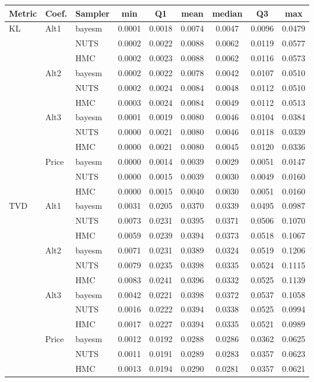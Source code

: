 \begin{tabular}{lllcccccc}
\toprule
Metric & Coef. & Sampler & min & Q1 & mean & median & Q3 & max \\
\midrule
KL & Alt1 & bayesm & 0.0001 & 0.0018 & 0.0074 & 0.0047 & 0.0096 & 0.0479 \\
 &  & NUTS & 0.0002 & 0.0022 & 0.0088 & 0.0062 & 0.0119 & 0.0577 \\
 &  & HMC & 0.0002 & 0.0023 & 0.0088 & 0.0062 & 0.0116 & 0.0573 \\
 & Alt2 & bayesm & 0.0002 & 0.0022 & 0.0078 & 0.0042 & 0.0107 & 0.0510 \\
 &  & NUTS & 0.0002 & 0.0024 & 0.0084 & 0.0048 & 0.0112 & 0.0510 \\
 &  & HMC & 0.0003 & 0.0024 & 0.0084 & 0.0049 & 0.0112 & 0.0513 \\
 & Alt3 & bayesm & 0.0001 & 0.0019 & 0.0080 & 0.0046 & 0.0104 & 0.0384 \\
 &  & NUTS & 0.0000 & 0.0021 & 0.0080 & 0.0046 & 0.0118 & 0.0339 \\
 &  & HMC & 0.0000 & 0.0021 & 0.0080 & 0.0045 & 0.0120 & 0.0336 \\
 & Price & bayesm & 0.0000 & 0.0014 & 0.0039 & 0.0029 & 0.0051 & 0.0147 \\
 &  & NUTS & 0.0000 & 0.0015 & 0.0039 & 0.0030 & 0.0049 & 0.0160 \\
 &  & HMC & 0.0000 & 0.0015 & 0.0040 & 0.0030 & 0.0051 & 0.0160 \\
TVD & Alt1 & bayesm & 0.0031 & 0.0205 & 0.0370 & 0.0339 & 0.0495 & 0.0987 \\
 &  & NUTS & 0.0073 & 0.0231 & 0.0395 & 0.0371 & 0.0506 & 0.1070 \\
 &  & HMC & 0.0059 & 0.0239 & 0.0394 & 0.0373 & 0.0518 & 0.1067 \\
 & Alt2 & bayesm & 0.0071 & 0.0231 & 0.0389 & 0.0324 & 0.0519 & 0.1206 \\
 &  & NUTS & 0.0079 & 0.0235 & 0.0398 & 0.0335 & 0.0524 & 0.1115 \\
 &  & HMC & 0.0083 & 0.0241 & 0.0396 & 0.0332 & 0.0525 & 0.1139 \\
 & Alt3 & bayesm & 0.0042 & 0.0221 & 0.0398 & 0.0372 & 0.0537 & 0.1058 \\
 &  & NUTS & 0.0016 & 0.0222 & 0.0394 & 0.0338 & 0.0525 & 0.0994 \\
 &  & HMC & 0.0017 & 0.0227 & 0.0394 & 0.0335 & 0.0521 & 0.0989 \\
 & Price & bayesm & 0.0012 & 0.0192 & 0.0288 & 0.0286 & 0.0362 & 0.0625 \\
 &  & NUTS & 0.0011 & 0.0191 & 0.0289 & 0.0283 & 0.0357 & 0.0623 \\
 &  & HMC & 0.0013 & 0.0194 & 0.0290 & 0.0281 & 0.0357 & 0.0621 \\
\bottomrule
\end{tabular}
